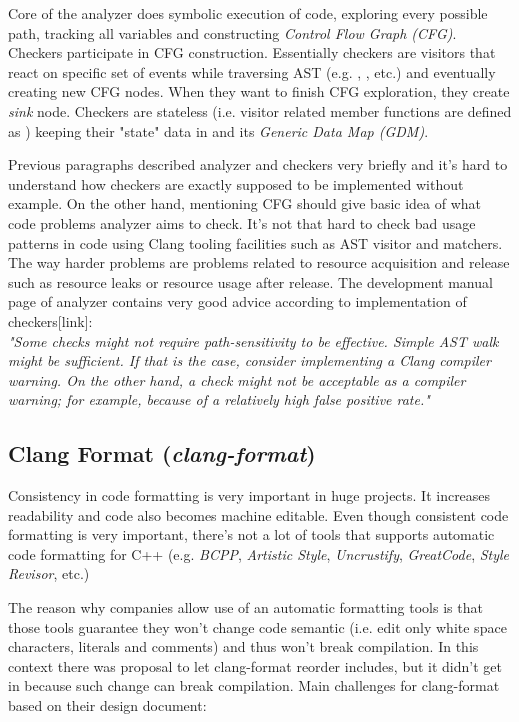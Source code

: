 Core of the analyzer does symbolic execution of code, exploring every possible path, tracking all variables and constructing \emph{Control Flow Graph (CFG)}. Checkers participate in CFG construction. Essentially checkers are visitors that react on specific set of events while traversing AST (e.g. , , etc.) and eventually creating new CFG nodes. When they want to finish CFG exploration, they create \emph{sink} node. Checkers are stateless (i.e. visitor related member functions are defined as ) keeping their "state" data in  and its \emph{Generic Data Map (GDM)}.

Previous paragraphs described analyzer and checkers very briefly and it's hard to understand how checkers are exactly supposed to be implemented without example. On the other hand, mentioning CFG should give basic idea of what code problems analyzer aims to check. It's not that hard to check bad usage patterns in code using Clang tooling facilities such as AST visitor and matchers. The way harder problems are problems related to resource acquisition and release such as resource leaks or resource usage after release. The development manual page of analyzer contains very good advice according to implementation of checkers[link]:\\

\label{clang-analyzer-checkers}
\emph{"Some checks might not require path-sensitivity to be effective. Simple AST walk might be sufficient. If that is the case, consider implementing a Clang compiler warning. On the other hand, a check might not be acceptable as a compiler warning; for example, because of a relatively high false positive rate."}

\subsection{Clang Format (\emph{clang-format})}
Consistency in code formatting is very important in huge projects. It increases readability and code also becomes machine editable. Even though consistent code formatting is very important, there's not a lot of tools that supports automatic code formatting for C++ (e.g. \textit{BCPP}, \textit{Artistic Style}, \textit{Uncrustify}, \textit{GreatCode}, \emph{Style Revisor}, etc.)

The reason why companies allow use of an automatic formatting tools is that those tools guarantee they won't change code semantic (i.e. edit only white space characters, literals and comments) and thus won't break compilation. In this context there was proposal to let clang-format reorder includes, but it didn't get in because such change can break compilation. Main challenges for clang-format based on their design document:

